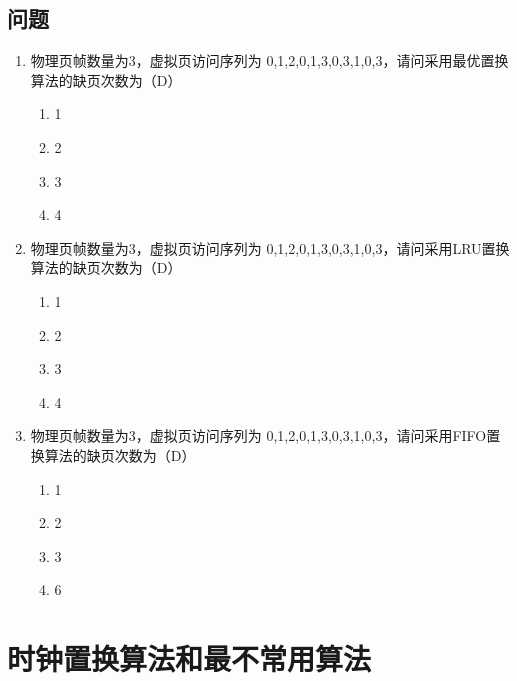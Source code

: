 \subsection{问题}
\begin{enumerate}
\item 物理页帧数量为3，虚拟页访问序列为 0,1,2,0,1,3,0,3,1,0,3，请问采用最优置换算法的缺页次数为（D）
\begin{enumerate}[A]
	\item 1
	\item 2
	\item 3
	\item 4
\end{enumerate}

\item 物理页帧数量为3，虚拟页访问序列为 0,1,2,0,1,3,0,3,1,0,3，请问采用LRU置换算法的缺页次数为（D）
\begin{enumerate}[A]
	\item 1
	\item 2
	\item 3
	\item 4
\end{enumerate}

\item 物理页帧数量为3，虚拟页访问序列为 0,1,2,0,1,3,0,3,1,0,3，请问采用FIFO置换算法的缺页次数为（D）
\begin{enumerate}[A]
	\item 1
	\item 2
	\item 3
	\item 6
\end{enumerate}
\end{enumerate}

\section{时钟置换算法和最不常用算法}
